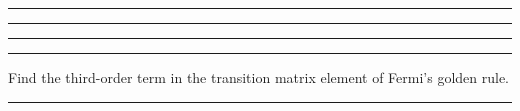 \noindent\rule{7in}{1.5pt}


\begin{problem}{2.14}

\end{problem}
    
\begin{solution}
            
\end{solution}
    
\noindent\rule{7in}{1.5pt}


\begin{problem}{2.15}

\end{problem}
    
\begin{solution}
            
\end{solution}
    
\noindent\rule{7in}{1.5pt}


\begin{problem}{2.16}

\end{problem}
    
\begin{solution}
            
\end{solution}
    
\noindent\rule{7in}{1.5pt}




\begin{problem}{2.17}
Find the third-order term in the transition matrix element of Fermi's golden rule.
\end{problem}

\begin{solution}
        
\end{solution} 

\noindent\rule{7in}{1.5pt}